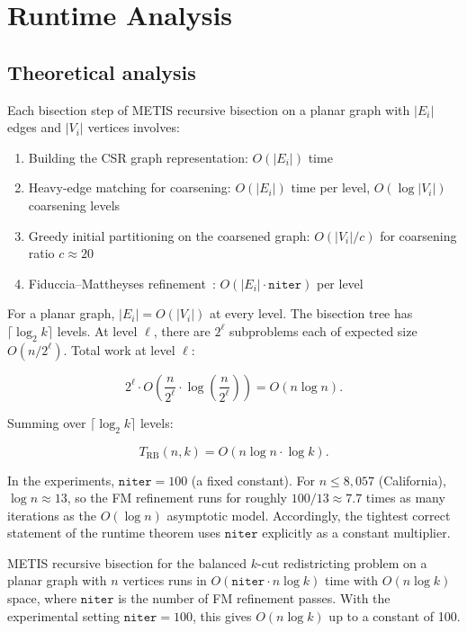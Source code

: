 \section{Runtime Analysis}
\label{sec:runtime}

\subsection{Theoretical analysis}

Each bisection step of METIS recursive bisection on a planar graph
with $|E_i|$ edges and $|V_i|$ vertices involves:

\begin{enumerate}
  \item Building the CSR graph representation: $O(|E_i|)$ time
  \item Heavy-edge matching for coarsening: $O(|E_i|)$ time per level,
    $O(\log |V_i|)$ coarsening levels
  \item Greedy initial partitioning on the coarsened graph: $O(|V_i|/c)$
    for coarsening ratio $c \approx 20$
  \item Fiduccia--Mattheyses refinement~\citep{fiduccia1982linear}:
    $O(|E_i| \cdot \texttt{niter})$ per level
\end{enumerate}

For a planar graph, $|E_i| = O(|V_i|)$ at every level.
The bisection tree has $\lceil \log_2 k \rceil$ levels.
At level $\ell$, there are $2^\ell$ subproblems each of expected size
$O(n / 2^\ell)$.  Total work at level $\ell$:

\[
  2^\ell \cdot O\!\left(\frac{n}{2^\ell} \cdot \log\!\left(\frac{n}{2^\ell}\right)\right)
  = O(n \log n).
\]

Summing over $\lceil \log_2 k \rceil$ levels:

\[
  T_{\mathrm{RB}}(n, k) = O(n \log n \cdot \log k).
\]

In the experiments, $\texttt{niter} = 100$ (a fixed constant).
For $n \leq 8{,}057$ (California), $\log n \approx 13$, so the FM
refinement runs for roughly $100/13 \approx 7.7$ times as many iterations
as the $O(\log n)$ asymptotic model.
Accordingly, the tightest correct statement of the runtime theorem uses
$\texttt{niter}$ explicitly as a constant multiplier.

\begin{theorem}
\label{thm:runtime}
METIS recursive bisection for the balanced $k$-cut redistricting problem
on a planar graph with $n$ vertices runs in
$O(\texttt{niter} \cdot n \log k)$ time with $O(n \log k)$ space,
where $\texttt{niter}$ is the number of FM refinement passes.
With the experimental setting $\texttt{niter} = 100$, this gives
$O(n \log k)$ up to a constant of 100.
\end{theorem}

